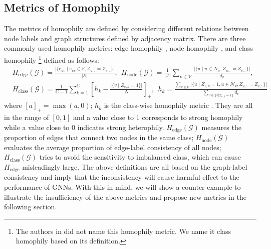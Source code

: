 \documentclass{article}
\newcommand{\0}{{\boldsymbol{0}}}
\newcommand{\6}{{\partial}}
\newcommand{\8}{{\infty}}
\newcommand{\4}{{\nabla}}
\begin{document}
\subsection{Metrics of Homophily}
\label{sec:homophily_metrics}
The metrics of homophily are defined by considering different relations between node labels and graph structures defined by adjacency matrix. There are three commonly used homophily metrics: edge homophily \cite{abu2019mixhop,zhu2020beyond}, node homophily \cite{pei2020geom}, and class homophily \cite{lim2021new} \footnote{The authors in \cite{lim2021new} did not name this homophily metric. We name it class homophily based on its definition.} defined as follows:
\begin{equation}
\begin{aligned}
\label{eq:definition_homophily_metrics}
    &H_\text{edge}(\mathcal{G}) = \frac{\big|\{e_{uv} \mid e_{uv}\in \mathcal{E}, Z_{u,:}=Z_{v,:}\}\big|}{|\mathcal{E}|}, \ \ 
    H_\text{node}(\mathcal{G}) = \frac{1}{|\mathcal{V}|} \sum_{v \in \mathcal{V}} 
    \frac{\big|\{u \mid u \in \mathcal{N}_v, Z_{u,:}=Z_{v,:}\}\big|}{d_v}, \\
    &H_\text{class}(\mathcal{G}) = \frac{1}{C-1} \sum_{k=1}^{C}\left[h_{k}
    -\frac{\big|\{v \mid Z_{v,k} = 1 \}\big|}{N}\right]_{+}, \ \ 
    h_{k}=\frac{\sum_{v \in \mathcal{V}} \big|\{u \mid Z_{v,k} = 1, u \in \mathcal{N}_v,   Z_{u,:}=Z_{v,:}\}\big| }{\sum_{v \in \{v|Z_{v,k}=1\}} d_{v}}
\end{aligned}
\end{equation}
where $[a]_{+}=\max (a, 0)$; $h_{k}$ is the class-wise homophily metric \cite{lim2021new}. They are all in the range of $[0,1]$ and a value close to $1$ corresponds to strong homophily while a value close to $0$ indicates strong heterophily. $H_\text{edge}(\mathcal{G})$ measures the proportion of edges that connect two nodes in the same class; $H_\text{node}(\mathcal{G})$ evaluates the average proportion of edge-label consistency of all nodes; $H_\text{class}(\mathcal{G})$ tries to avoid the sensitivity to imbalanced class, which can cause $H_\text{edge}$ misleadingly large. The above definitions are all based on the graph-label consistency and imply that the inconsistency will cause harmful effect to the performance of GNNs. With this in mind, we will show a counter example to illustrate the insufficiency of the above metrics and propose new metrics in the following section.
\end{document}
